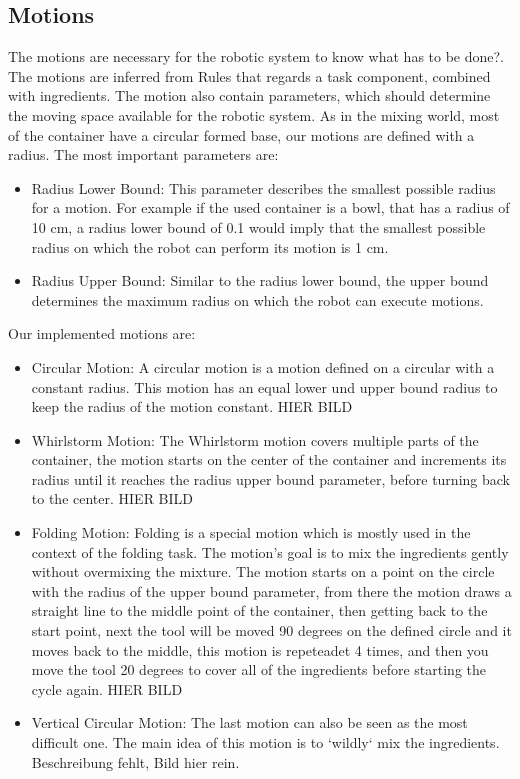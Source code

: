\subsection*{Motions}
The motions are necessary for the robotic system to know what has to be done?. The motions are inferred from Rules that regards a task component, combined with ingredients.
The motion also contain parameters, which should determine the moving space available for the robotic system. As in the mixing world, most of the container have a circular formed base, our motions are defined with a radius.
The most important parameters are:
\begin{itemize}
    \item Radius Lower Bound: This parameter describes the smallest possible radius for a motion. For example if the used container is a bowl, that has a radius of 10 cm, a radius lower bound of 0.1 would imply that the smallest possible radius on which the robot can perform its motion is 1 cm.
    \item Radius Upper Bound: Similar to the radius lower bound, the upper bound determines the maximum radius on which the robot can execute motions.
\end{itemize}
Our implemented motions are:
\begin{itemize}
    \item Circular Motion: A circular motion is a motion defined on a circular with a constant radius. This motion has an equal lower und upper bound radius to keep the radius of the motion constant.  \newline HIER BILD
    \item Whirlstorm Motion: The Whirlstorm motion covers multiple parts of the container, the motion starts on the center of the container and increments its radius until it reaches the radius upper bound parameter, before turning back to the center. \newline HIER BILD
    \item Folding Motion: Folding is a special motion which is mostly used in the context of the folding task. The motion's goal is to mix the ingredients gently without overmixing the mixture. The motion starts on a point on the circle with the radius of the upper bound parameter, from there the motion draws a straight line to the middle point of the container, then getting back to the start point, next the tool will be moved 90 degrees on the defined circle and it moves back to the middle, this motion is repeteadet 4 times, and then you move the tool 20 degrees to cover all of the ingredients before starting the cycle again. \newline HIER BILD
    \item Vertical Circular Motion: The last motion can also be seen as the most difficult one. The main idea of this motion is to `wildly` mix the ingredients. Beschreibung fehlt, Bild hier rein.
\end{itemize}

